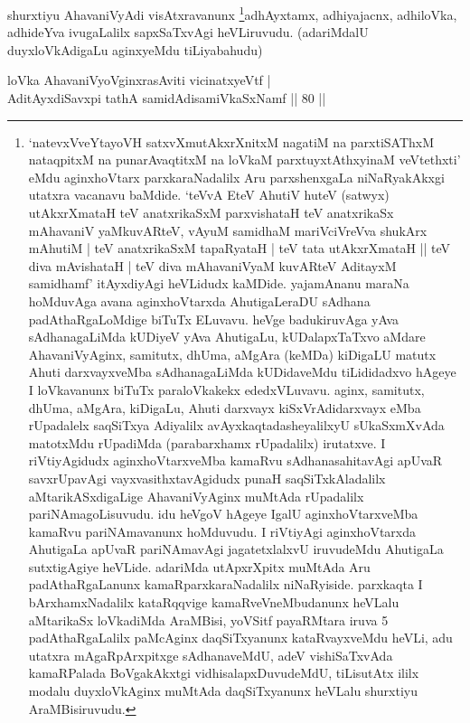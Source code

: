 \begin{artha}
shurxtiyu AhavaniVyAdi visAtxravanunx \footnote[1]{`natevxVveYtayoVH satxvXmutAkxrXnitxM nagatiM na parxtiSAThxM nataqpitxM na punarAvaqtitxM na loVkaM parxtuyxtAthxyinaM veVtethxti' eMdu aginxhoVtarx parxkaraNadalilx Aru parxshenxgaLa niNaRyakAkxgi utatxra vacanavu baMdide. `teVvA EteV AhutiV huteV (satwyx) utAkxrXmataH teV anatxrikaSxM parxvishataH teV anatxrikaSx mAhavaniV yaMkuvARteV, vAyuM samidhaM mariVciVreVva shukArx mAhutiM | teV anatxrikaSxM tapaRyataH | teV tata utAkxrXmataH || teV diva mAvishataH | teV diva mAhavaniVyaM kuvARteV AditayxM samidhamf' itAyxdiyAgi heVLidudx kaMDide. yajamAnanu maraNa hoMduvAga avana aginxhoVtarxda AhutigaLeraDU sAdhana padAthaRgaLoMdige biTuTx ELuvavu. heVge badukiruvAga yAva sAdhanagaLiMda kUDiyeV yAva AhutigaLu, kUDalapxTaTxvo aMdare AhavaniVyAginx, samitutx, dhUma, aMgAra (keMDa) kiDigaLU matutx Ahuti darxvayxveMba sAdhanagaLiMda kUDidaveMdu tiLididadxvo hAgeye I loVkavanunx biTuTx paraloVkakekx ededxVLuvavu. aginx, samitutx, dhUma, aMgAra, kiDigaLu, Ahuti darxvayx kiSxVrAdidarxvayx eMba rUpadalelx saqSiTxya Adiyalilx avAyxkaqtadasheyalilxyU sUkaSxmXvAda matotxMdu rUpadiMda (parabarxhamx rUpadalilx) irutatxve. I riVtiyAgidudx aginxhoVtarxveMba kamaRvu sAdhanasahitavAgi apUvaR savxrUpavAgi vayxvasithxtavAgidudx punaH saqSiTxkAladalilx aMtarikASxdigaLige AhavaniVyAginx muMtAda rUpadalilx pariNAmagoLisuvudu. idu heVgoV hAgeye IgalU aginxhoVtarxveMba kamaRvu pariNAmavanunx hoMduvudu. I riVtiyAgi aginxhoVtarxda AhutigaLa apUvaR pariNAmavAgi jagatetxlalxvU iruvudeMdu AhutigaLa sutxtigAgiye heVLide. adariMda utApxrXpitx muMtAda Aru padAthaRgaLanunx kamaRparxkaraNadalilx niNaRyiside. parxkaqta I bArxhamxNadalilx kataRqqvige kamaRveVneMbudanunx heVLalu aMtarikaSx loVkadiMda AraMBisi, yoVSitf payaRMtara iruva 5 padAthaRgaLalilx paMcAginx daqSiTxyanunx kataRvayxveMdu heVLi, adu utatxra mAgaRpArxpitxge sAdhanaveMdU, adeV vishiSaTxvAda kamaRPalada BoVgakAkxtgi vidhisalapxDuvudeMdU, tiLisutAtx ililx modalu duyxloVkAginx muMtAda daqSiTxyanunx heVLalu shurxtiyu AraMBisiruvudu.}adhAyxtamx, adhiyajacnx, adhiloVka, adhideYva ivugaLalilx sapxSaTxvAgi heVLiruvudu. (adariMdalU duyxloVkAdigaLu aginxyeMdu tiLiyabahudu)
\end{artha}

\begin{shl}
loVka AhavaniVyoV\s ginxrasAviti vicinatxyeVtf | \\
AditAyxdiSavxpi tathA samidAdisamiVkaSxNamf \hfill|| 80 || 
\end{shl}

